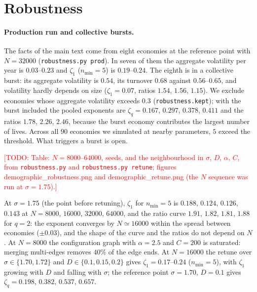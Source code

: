 \documentclass[pre,onecolumn,superscriptaddress,nofootinbib]{revtex4-2}
\newcommand{\todo}[1]{\textcolor{red}{[TODO: #1]}}
\begin{document}
\section{Robustness}
\label{sec:robust}

\paragraph{Production run and collective bursts.}  The facts of the main text come from eight economies
at the reference point with $N=32000$ (\texttt{robustness.py prod}).  In seven of them the aggregate
volatility per year is $0.03$--$0.23$ and $\zeta_1$ ($n_{\min}=5$) is $0.19$--$0.24$.  The eighth is in a
collective burst: its aggregate volatility is $0.54$, its turnover $0.68$ against $0.56$--$0.65$, and
volatility hardly depends on size ($\zeta_1=0.07$, ratios $1.54$, $1.56$, $1.15$).  We exclude economies
whose aggregate volatility exceeds $0.3$ (\texttt{robustness.kept}); with the burst included the pooled
exponents are $\zeta_q=0.167$, $0.297$, $0.378$, $0.411$ and the ratios $1.78$, $2.26$, $2.46$, because the burst
economy contributes the largest number of lives.  Across all $90$ economies we simulated at nearby
parameters, $5$ exceed the threshold.  What triggers a burst is open.

\todo{Table: $N=8000$--$64000$, seeds, and the neighbourhood in $\sigma$, $D$, $\alpha$, $C$, from
\texttt{robustness.py} and \texttt{robustness.py retune}; figures demographic\_robustness.png and
demographic\_retune.png (the $N$ sequence was run at $\sigma=1.75$).}

At $\sigma=1.75$ (the point before retuning), $\zeta_1$ for $n_{\min}=5$ is $0.188$, $0.124$, $0.126$, $0.143$ at
$N=8000$, $16000$, $32000$, $64000$, and the ratio curve $1.91$, $1.82$, $1.81$, $1.88$ for $q=2$: the
exponent converges by $N\simeq16000$ within the spread between economies ($\pm0.03$), and the shape of
the curve and the ratios do not depend on $N$.  At $N=8000$ the configuration graph with $\alpha=2.5$ and
$C=200$ is saturated: merging multi-edges removes $40\%$ of the edge ends.  At $N=16000$ the retune over
$\sigma\in\{1.70,1.72\}$ and $D\in\{0.1,0.15,0.2\}$ gives $\zeta_1=0.17$--$0.24$ ($n_{\min}=5$), with $\zeta_1$ growing
with $D$ and falling with $\sigma$; the reference point $\sigma=1.70$, $D=0.1$ gives $\zeta_q=0.198$, $0.382$, $0.537$,
$0.657$.

\end{document}
